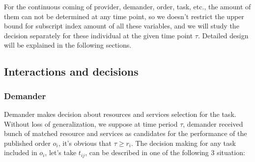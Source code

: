 For the continuous coming of provider, demander, order, task, etc., the amount of them can not be determined at any time point, so we doesn't restrict the upper bound for subscript index amount of all these variables, and we will study the decision separately for these individual at the given time point $\tau$. Detailed design will be explained in the following sections.

\subsection{Interactions and decisions} %
\label{sub:interactions_and_decisions}
\subsubsection{Demander}
\label{subs:Demander}
Demander makes decision about resources and services selection for the task. Without loss of generalization, we suppose at time period $\tau$, demander received bunch of matched resource and services as candidates for the performance of the published order $o_i$, it's obvious that $\tau \ge r_{i}$. The decision making for any task included in $o_i$, let's take $t_{ij}$, can be described in one of the following 3 situation:

